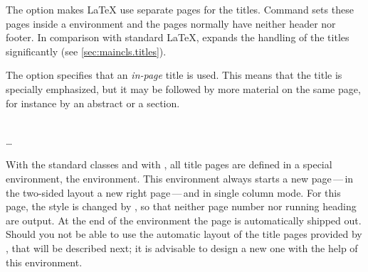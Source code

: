 The option
makes {\LaTeX} use separate
pages for the titles.  Command  sets these pages inside a
 environment and the pages normally have neither header
nor footer. In comparison with standard {\LaTeX}, {\KOMAScript} expands the
handling of the titles significantly (see \autoref{sec:maincls.titles}).

The option
specifies that an \emph{in-page} title is used. This means that the title is
specially emphasized, but it may be followed by more material on the same
page, for instance by an abstract or a section.%
%

%
%
%


\begin{Declaration}
  \\
  \quad\dots\\
\end{Declaration}%
%
With the standard classes and with {\KOMAScript}, all title pages are defined
in a special environment, the  environment.  This
environment always starts a new page\,---\,in the two-sided layout a new right
page\,---\,and in single column mode. For this page, the style is changed by
, so that neither page number nor
running heading are output. At the end of the environment the page is
automatically shipped out. Should you not be able to use the automatic layout
of the title pages provided by , that will be described next;
it is advisable to design a new one with the help of this environment.


